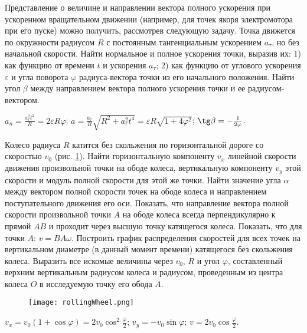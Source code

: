 \begin{ex} %
Представление о величине и направлении вектора полного ускорения при ускоренном вращательном движении (например, для точек якоря электромотора при его пуске) можно получить, рассмотрев следующую задачу. Точка движется по окружности радиусом $R$ с постоянным тангенциальным ускорением $a_{\tau}$, но без начальной скорости. Найти нормальное и полное ускорения точки, выразив их: 1) как функцию от времени $t$ и ускорения $a_{\tau}$; 2) как функцию от углового ускорения $\varepsilon$ и угла поворота $\varphi$ радиуса-вектора точки из его начального положения. Найти угол $\beta$ между направлением вектора полного ускорения точки и ее
радиусом-вектором.
\begin{ans}
$a_n = \frac{a_{\tau}^2 t^2}{R} = 2 \varepsilon R \varphi$; $a = \frac{a_{\tau}}{R} \sqrt{R^2 + a_{\tau}^2 t^4} = \varepsilon R \sqrt{1 + 4 \varphi^2}$; $\tg \beta = -\frac{1}{2\varphi}$.
\end{ans}
\end{ex}

\complexProblems

\begin{ex} %
Колесо радиуса $R$ катится без скольжения по горизонтальной дороге со скоростью $v_0$ (рис. \ref{rollingWheel}). Найти горизонтальную компоненту $v_x$ линейной скорости движения произвольной точки на ободе колеса, вертикальную компоненту $v_y$ этой скорости и модуль полной скорости для этой же точки. Найти значение угла $\alpha$ между вектором полной скорости точек на ободе колеса и направлением поступательного движения его оси. Показать, что направление вектора полной скорости произвольной точки $A$ на ободе колеса всегда перпендикулярно к прямой $AB$ и проходит через высшую точку катящегося колеса. Показать, что для точки $A$: $v = BA \omega$. Построить график распределения скоростей для всех точек на вертикальном диаметре (в данный момент времени) катящегося без скольжения колеса. Выразить все искомые величины через $v_0$, $R$ и угол $\varphi$, составленный верхним вертикальным радиусом колеса и радиусом, проведенным из центра колеса $O$ в исследуемую точку его обода $A$.

\begin{figure}[h]
\centering
\texttt{[image: rollingWheel.png]}
\caption{}
\label{rollingWheel}
\end{figure}

\begin{ans}
$v_x = v_0 (1 + \cos \varphi) = 2v_0 \cos^2 \frac{\varphi}{2}$; $v_y = -v_0 \sin \varphi$; $v = 2v_0 \cos \frac{\varphi}{2}$.
\end{ans}
\end{ex}

